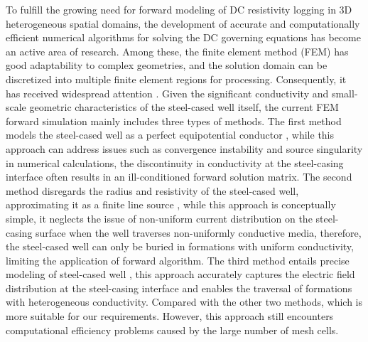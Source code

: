 \documentclass[manuscript,blind]{geophysics}
\begin{document}
To fulfill the growing need for forward modeling of DC resistivity logging in 3D heterogeneous spatial domains, the development of accurate and computationally efficient numerical algorithms for solving the DC governing equations has become an active area of research. Among these, the finite element method (FEM) has good adaptability to complex geometries, and the solution domain can be discretized into multiple finite element regions for processing. Consequently, it has received widespread attention \citep{bing2001finite,li2002three,yang20173ddc,heagy2019direct}. Given the significant conductivity and small-scale geometric characteristics of the steel-cased well itself, the current FEM forward simulation mainly includes three types of methods. The first method models the steel-cased well as a perfect equipotential conductor \citep{rucker2011simulation,johnson2015accurate}, while this approach can address issues such as convergence instability and source singularity in numerical calculations, the discontinuity in conductivity at the steel-casing interface often results in an ill-conditioned forward solution matrix. The second method disregards the radius and resistivity of the steel-cased well, approximating it as a finite line source \citep{zhu2011resistivity},  while this approach is conceptually simple, it neglects the issue of non-uniform current distribution on the steel-casing surface when the well traverses non-uniformly conductive media, therefore, the steel-cased well can only be buried in formations with uniform conductivity, limiting the application of forward algorithm. The third method entails precise modeling of steel-cased well \citep{pardo2008simulations,yifei2018study}, this approach accurately captures the electric field distribution at the steel-casing interface and enables the traversal of formations with heterogeneous conductivity. Compared with the other two methods, which is more suitable for our requirements. However, this approach still encounters computational efficiency problems caused by the large number of mesh cells. 
\end{document}
